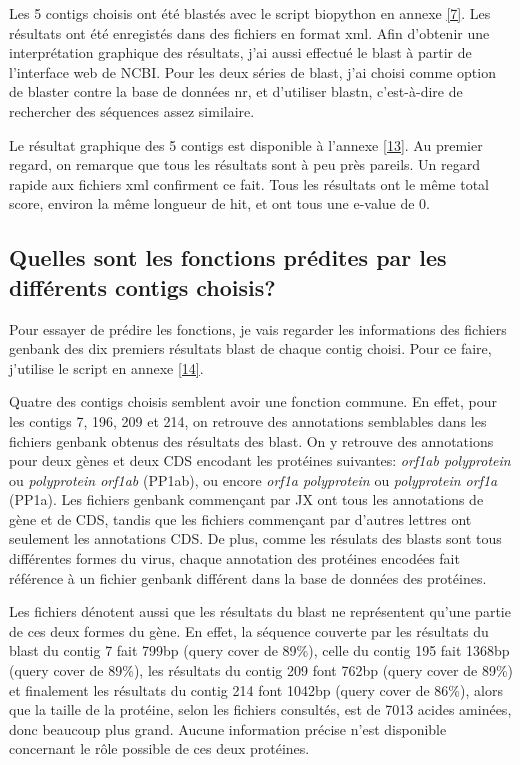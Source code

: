 \documentclass[11pt]{article} %
\begin{document}
Les 5 contigs choisis ont été blastés avec le script biopython en annexe \ref{7}. Les résultats ont été enregistés dans des
fichiers en format xml. Afin d'obtenir une interprétation graphique des résultats, j'ai aussi effectué le blast à partir de
l'interface web de NCBI. Pour les deux séries de blast, j'ai choisi comme option de blaster contre la base de données nr, 
et d'utiliser blastn, c'est-à-dire de rechercher des séquences assez similaire.

Le résultat graphique des 5 contigs est disponible à l'annexe \ref{13}. Au premier regard, on remarque que tous les résultats
sont à peu près pareils. Un regard rapide aux fichiers xml confirment ce fait. Tous les résultats ont le même total score,
environ la même longueur de hit, et ont tous une e-value de 0.

\subsection[Fonctions prédites des contigs]{Quelles sont les fonctions prédites par les différents contigs choisis?}

Pour essayer de prédire les fonctions, je vais regarder les informations des fichiers genbank des dix premiers résultats
blast de chaque contig choisi. Pour ce faire, j'utilise le script en annexe \ref{14}.

Quatre des contigs choisis semblent avoir une fonction commune. En effet, pour les contigs 7, 196, 209 et 214, on retrouve
des annotations semblables dans les fichiers genbank obtenus des résultats des blast. On y retrouve des annotations pour deux
gènes et deux CDS encodant les protéines suivantes: \emph{orf1ab polyprotein} ou \emph{polyprotein orf1ab} (PP1ab), ou encore
\emph{orf1a polyprotein} ou \emph{polyprotein orf1a} (PP1a). Les fichiers genbank commençant par JX ont tous les annotations
de gène et de CDS, tandis que les fichiers commençant par d'autres lettres ont seulement les annotations CDS. De plus,
comme les résulats des blasts sont tous différentes formes du virus, chaque annotation des protéines encodées fait référence
à un fichier genbank différent dans la base de données des protéines.

Les fichiers dénotent aussi que les résultats du blast ne représentent qu'une partie de ces deux formes du gène. En effet,
la séquence couverte par les résultats du blast du contig 7 fait 799bp (query cover de 89\%), celle du contig 195 fait
1368bp (query cover de 89\%), les résultats du contig 209 font 762bp (query cover de 89\%) et finalement les résultats du
contig 214 font 1042bp (query cover de 86\%), alors que la taille de la protéine, selon les fichiers consultés, est de
7013 acides aminées, donc beaucoup plus grand. Aucune information précise n'est disponible concernant le rôle possible
de ces deux protéines.
\end{document}
